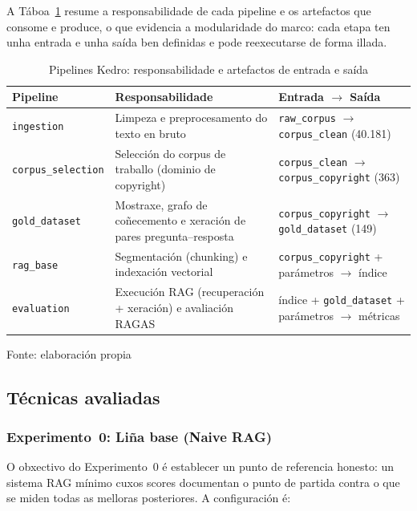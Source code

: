 \documentclass[11pt, a4paper, oneside]{report}
\newcommand{\fonte}[1]{%
  \par\smallskip
  {\centering\fontsize{9}{11}\selectfont Fonte: #1\par}}
\begin{document}
A Táboa~\ref{tab:pipelines} resume a responsabilidade de cada pipeline e os artefactos
que consome e produce, o que evidencia a modularidade do marco: cada etapa ten unha
entrada e unha saída ben definidas e pode reexecutarse de forma illada.

\begin{table}[H]
  \centering
  \caption{Pipelines Kedro: responsabilidade e artefactos de entrada e saída}
  \label{tab:pipelines}
  \footnotesize
  \begin{tabular}{>{\raggedright\arraybackslash}p{2.6cm}>{\raggedright\arraybackslash}p{6.0cm}>{\raggedright\arraybackslash}p{4.4cm}}
    \toprule
    \textbf{Pipeline} & \textbf{Responsabilidade} & \textbf{Entrada $\rightarrow$ Saída} \\
    \midrule
    \texttt{ingestion} & Limpeza e preprocesamento do texto en bruto &
      \texttt{raw\_corpus} $\rightarrow$ \texttt{corpus\_clean} (40.181) \\
    \texttt{corpus\_selection} & Selección do corpus de traballo (dominio de copyright) &
      \texttt{corpus\_clean} $\rightarrow$ \texttt{corpus\_copyright} (363) \\
    \texttt{gold\_dataset} & Mostraxe, grafo de coñecemento e xeración de pares pregunta--resposta &
      \texttt{corpus\_copyright} $\rightarrow$ \texttt{gold\_dataset} (149) \\
    \texttt{rag\_base} & Segmentación (chunking) e indexación vectorial &
      \texttt{corpus\_copyright} + parámetros $\rightarrow$ índice \\
    \texttt{evaluation} & Execución RAG (recuperación + xeración) e avaliación RAGAS &
      índice + \texttt{gold\_dataset} + parámetros $\rightarrow$ métricas \\
    \bottomrule
  \end{tabular}
  \fonte{elaboración propia}
\end{table}

\subsection{Técnicas avaliadas}
\label{sec:tecnicas_avaliadas}

\subsubsection{Experimento~0: Liña base (Naive RAG)}
\label{sec:exp0_baseline}

O obxectivo do Experimento~0 é establecer un punto de referencia honesto: un sistema
RAG mínimo cuxos scores documentan o punto de partida contra o que se miden todas as
melloras posteriores. A configuración é:
\end{document}
